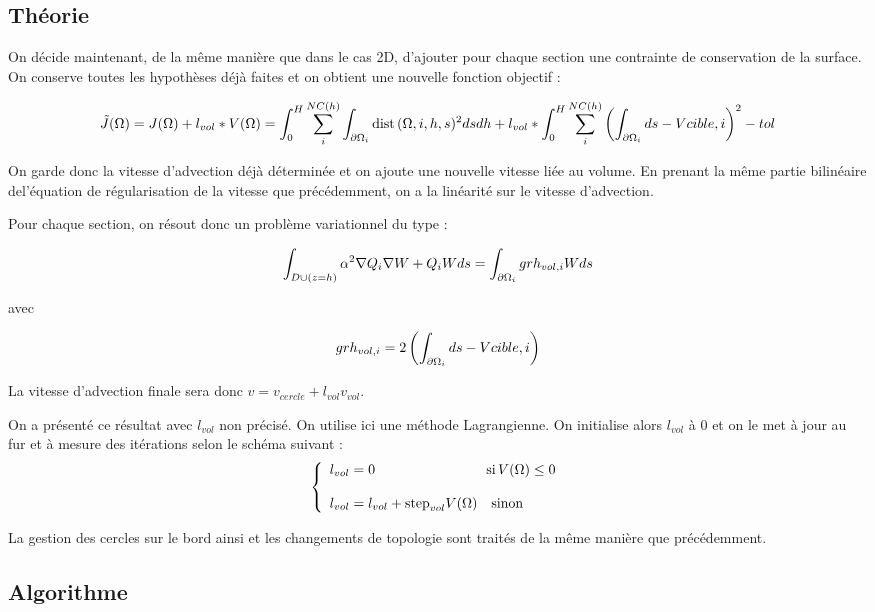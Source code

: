 \documentclass[11pt,a4paper]{article}
\begin{document}
\subsection{Théorie}

On décide maintenant, de la même manière que dans le cas 2D, d'ajouter pour chaque section une contrainte de conservation de la surface. On conserve toutes les hypothèses déjà faites et on obtient une nouvelle fonction objectif :

\begin{equation}
\tilde{J}(\Omega)=J(\Omega)+l_{vol}*V(\Omega)=\int_0^H \sum_{i}^{NC(h)}\int_{\partial\Omega_{i}} \textrm{dist}\,(\Omega,i,h,s)^2dsdh+l_{vol}*\int_0^H\sum_{i}^{NC(h)}\left(\int_{\partial\Omega_{i}}ds-V{cible,i}\right)^2-tol
\end{equation}

On garde donc la vitesse d'advection déjà déterminée et on ajoute une nouvelle vitesse liée au volume. En prenant la même partie bilinéaire del'équation de régularisation de la vitesse que précédemment, on a la linéarité sur le vitesse d'advection.

Pour chaque section, on résout donc un problème variationnel du type :

	\begin{equation}
	\int_{D\cup (z=h)} \alpha^2\nabla Q_i\nabla W+Q_iWds=\int_{\partial\Omega_{i}}grh_{vol,i}Wds
	\end{equation}

avec 

\begin{equation}
grh_{vol,i}=2\left(\int_{\partial\Omega_{i}}ds-V{cible,i}\right)
\end{equation}

La vitesse d'advection finale sera donc $v=v_{cercle}+l_{vol}v_{vol}$.

On a présenté ce résultat avec $l_{vol}$ non précisé. On utilise ici une méthode Lagrangienne. On initialise alors $l_{vol}$ à 0 et on le met à jour au fur et à mesure des itérations selon le schéma suivant :
\begin{equation}
\left\{\begin{array}{l}
	l_{vol}=0 \qquad \qquad  \qquad \qquad \textrm{si\,} V(\Omega)\leq 0\\
	\\
	l_{vol}=l_{vol}+\textrm{step}_{vol}V(\Omega) \quad \textrm{sinon}	
\end{array}\right.
\end{equation}

La gestion des cercles sur le bord ainsi et les changements de topologie sont traités de la même manière que précédemment.

\subsection{Algorithme}
\end{document}
